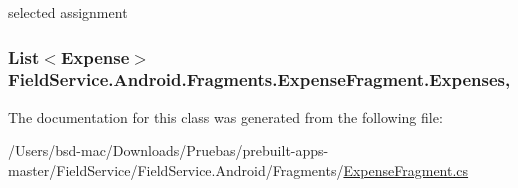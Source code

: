 selected assignment 

\hypertarget{class_field_service_1_1_android_1_1_fragments_1_1_expense_fragment_a36a612c9607ef8dc94562e5321f1405d}{
\subsubsection[{Expenses}]{\setlength{\rightskip}{0pt plus 5cm}List$<${\bf Expense}$>$ Field\+Service.\+Android.\+Fragments.\+Expense\+Fragment.\+Expenses\hspace{0.3cm}{\ttfamily [get]}, {\ttfamily [set]}}}\label{class_field_service_1_1_android_1_1_fragments_1_1_expense_fragment_a36a612c9607ef8dc94562e5321f1405d}


The documentation for this class was generated from the following file\+:\begin{DoxyCompactItemize}
\item 
/\+Users/bsd-\/mac/\+Downloads/\+Pruebas/prebuilt-\/apps-\/master/\+Field\+Service/\+Field\+Service.\+Android/\+Fragments/\hyperlink{_expense_fragment_8cs}{Expense\+Fragment.\+cs}\end{DoxyCompactItemize}
